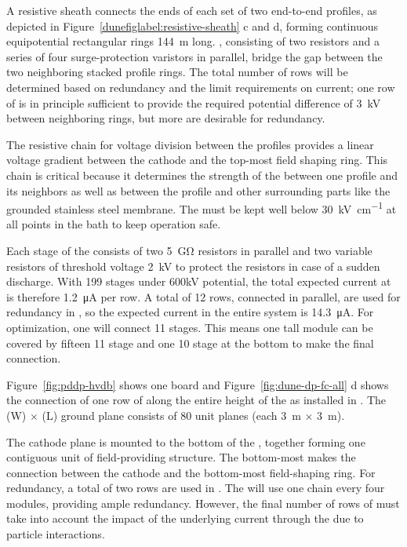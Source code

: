 A resistive sheath connects the ends of each set of two end-to-end  profiles, as depicted in Figure~\ref{dunefiglabel:resistive-sheath} c and d, forming continuous equipotential rectangular rings  \SI{144}{\m} long. 
, consisting of two resistors and a series of four surge-protection varistors in parallel, bridge the gap between the two neighboring stacked profile rings.   The total number of  rows will be determined based on redundancy and the limit requirements on current;  one row of  is in principle sufficient to provide the required potential difference of \SI{3}{\kV} between neighboring rings, but more are desirable for redundancy.


The resistive chain for voltage division between the profiles provides a linear voltage gradient between the cathode and the top-most field shaping ring. This chain is critical because it determines the strength of the \efield between one profile and its neighbors as well as between the profile and other surrounding parts like the grounded stainless steel membrane. The \efield must be kept well below \SI{30}{\kV\per\cm} at all points in the \lar bath to keep  operation safe.

Each stage of the  consists of two \SI{5}{\giga\ohm} resistors in parallel and two variable resistors of threshold voltage \SI{2}{kV} to protect the resistors in case of a sudden discharge.  With 199 stages under 600kV potential, the total expected current at \dptargetdriftvoltpos is therefore \SI{1.2}{\micro\ampere} per row.  A total of 12 rows, connected in parallel, are used for redundancy in , so the expected current in the entire system is \SI{14.3}{\micro\ampere}.
For optimization, one   will connect \num{11} stages.  This means  one \tpcheight tall module can be covered by fifteen \num{11} stage  and one \num{10} stage  at the bottom to make the final connection.  

Figure~\ref{fig:pddp-hvdb} shows one   board and  Figure~\ref{fig:dune-dp-fc-all} d shows the connection of one row of  along the entire height of the  as installed in . The \dptpcwdth (W) $\times$ \dptpclen (L) ground plane consists of \num{80} unit planes (each \SI{3}{\m} $\times$ \SI{3}{\m}).  

The cathode plane is mounted to the bottom of the , together forming one contiguous unit of field-providing structure.  The bottom-most  makes the connection between the cathode and the bottom-most field-shaping ring.
For redundancy, a total of two  rows are used in .  
The \dpmod will use one  chain every four  modules, providing ample redundancy.  However, the final number of rows of  must take into account the impact of the underlying current through the  due to particle interactions.

